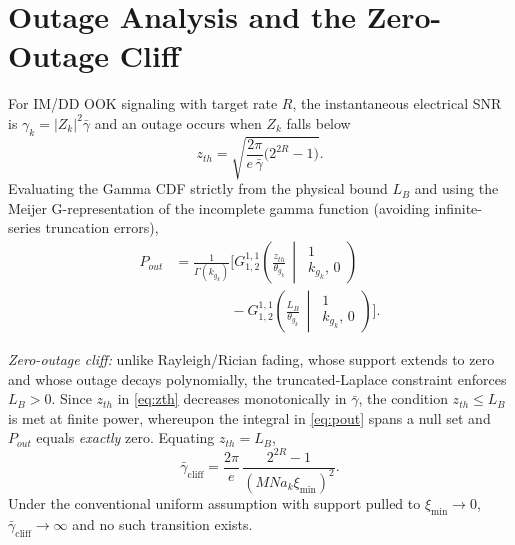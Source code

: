 \documentclass[conference]{IEEEtran}
\begin{document}
\section{Outage Analysis and the Zero-Outage Cliff}
For IM/DD OOK signaling with target rate $R$, the instantaneous electrical
SNR is $\gamma_k=|Z_k|^2\bar{\gamma}$ and an outage occurs when $Z_k$ falls
below
\begin{equation}
z_{th} = \sqrt{\frac{2\pi}{e\,\bar{\gamma}} \bigl( 2^{2R} - 1 \bigr)}.
\label{eq:zth}
\end{equation}
Evaluating the Gamma CDF strictly from the physical bound $L_B$ and using the
Meijer G-representation of the incomplete gamma function (avoiding
infinite-series truncation errors),
\begin{equation}
\begin{aligned}
P_{out} &= \frac{1}{\Gamma(k_{g_k})} \Biggl[
G_{1, 2}^{1, 1}\!\left( \frac{z_{th}}{\theta_{g_k}} \,\middle|\,
\begin{matrix} 1 \\ k_{g_k},\, 0 \end{matrix} \right)\\[2pt]
&\qquad\qquad
- G_{1, 2}^{1, 1}\!\left( \frac{L_B}{\theta_{g_k}} \,\middle|\,
\begin{matrix} 1 \\ k_{g_k},\, 0 \end{matrix} \right) \Biggr].
\end{aligned}
\label{eq:pout}
\end{equation}

\emph{Zero-outage cliff:} unlike Rayleigh/Rician fading, whose support
extends to zero and whose outage decays polynomially, the truncated-Laplace
constraint enforces $L_B>0$. Since $z_{th}$ in \eqref{eq:zth} decreases
monotonically in $\bar{\gamma}$, the condition $z_{th}\le L_B$ is met at
finite power, whereupon the integral in \eqref{eq:pout} spans a null set and
$P_{out}$ equals \emph{exactly} zero. Equating $z_{th}=L_B$,
\begin{equation}
\bar{\gamma}_{\mathrm{cliff}} = \frac{2\pi}{e}\,
\frac{2^{2R} - 1}{\left( M N a_k \xi_{\min} \right)^2}.
\label{eq:cliff}
\end{equation}
Under the conventional uniform assumption with support pulled to
$\xi_{\min}\!\to\!0$, $\bar{\gamma}_{\mathrm{cliff}}\!\to\!\infty$ and no such
transition exists.
\end{document}
